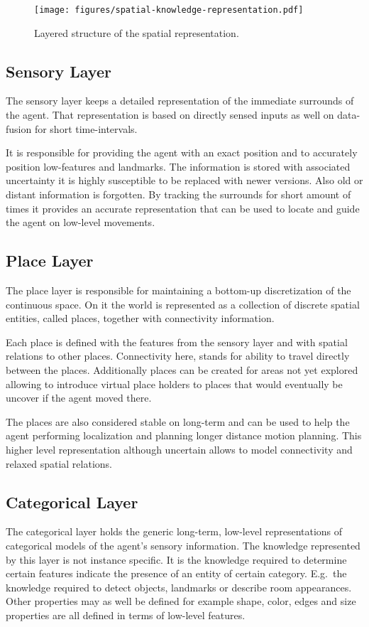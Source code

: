 \begin{figure}[h]
\centering
\texttt{[image: figures/spatial-knowledge-representation.pdf]}
\caption{\label{fig:spatial-knowledge}Layered structure of the spatial representation.}
\end{figure}

\subsection{Sensory Layer}
The sensory layer keeps a detailed representation of the immediate surrounds of the agent.
That representation is based on directly sensed inputs as well on data-fusion for short
time\hyp{}intervals.

It is responsible for providing the agent with an exact position and to accurately position
low\hyp{}features and landmarks. The information is stored with associated uncertainty it
is highly susceptible to be replaced with newer versions. Also old or distant information
is forgotten.
By tracking the surrounds for short amount of times it provides an accurate representation
that can be used to locate and guide the agent on low\hyp{}level movements.

\subsection{Place Layer}
The place layer is responsible for maintaining a bottom\hyp{}up discretization of the
continuous space. On it the world is represented as a collection of discrete spatial
entities, called places, together with connectivity information.

Each place is defined with the features from the sensory layer and with spatial relations
to other places. Connectivity here, stands for ability to travel directly between the
places. Additionally places can be created for areas not yet explored allowing to introduce
virtual place holders to places that would eventually be uncover if the agent moved there.

The places are also considered stable on long\hyp{}term and can be used to help the agent
performing localization and planning longer distance motion planning. This higher level
representation although uncertain allows to model connectivity and relaxed spatial relations.

\subsection{Categorical Layer}
The categorical layer holds the generic long-term, low-level representations of categorical models
of the agent's sensory information.
The knowledge represented by this layer is not instance specific. It is the knowledge
required to determine certain features indicate the presence of an entity of certain
category. E.g.\ the knowledge required to detect objects, landmarks or describe room appearances.
Other properties may as well be defined for example shape, color, edges and size properties
are all defined in terms of low\hyp{}level features.

